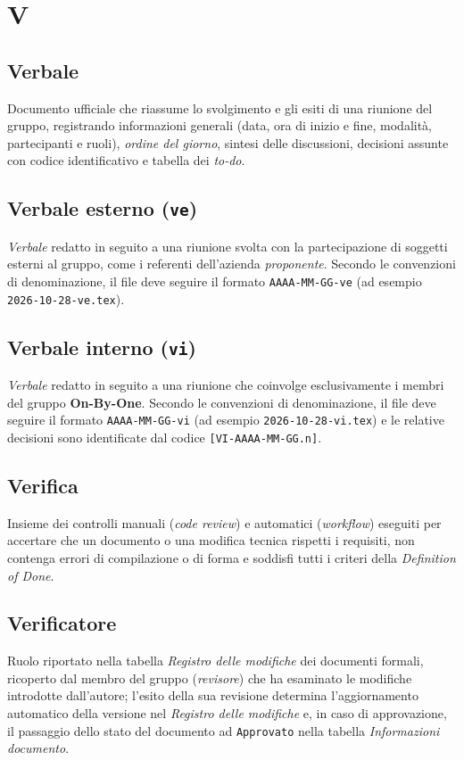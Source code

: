 \documentclass[11pt, a4paper]{article}
\begin{document}
\newpage

\section*{V}

\subsection*{Verbale}
Documento ufficiale che riassume lo svolgimento e gli esiti di una riunione del gruppo, registrando informazioni generali (data, ora di inizio e fine, modalità, partecipanti e ruoli), \textit{ordine del giorno}, sintesi delle discussioni, decisioni assunte con codice identificativo e tabella dei \textit{to-do}.

\subsection*{Verbale esterno (\texttt{ve})}
\textit{Verbale} redatto in seguito a una riunione svolta con la partecipazione di soggetti esterni al gruppo, come i referenti dell'azienda \textit{proponente}. Secondo le convenzioni di denominazione, il file deve seguire il formato \texttt{AAAA-MM-GG-ve} (ad esempio \texttt{2026-10-28-ve.tex}).

\subsection*{Verbale interno (\texttt{vi})}
\textit{Verbale} redatto in seguito a una riunione che coinvolge esclusivamente i membri del gruppo \textbf{On-By-One}. Secondo le convenzioni di denominazione, il file deve seguire il formato \texttt{AAAA-MM-GG-vi} (ad esempio \texttt{2026-10-28-vi.tex}) e le relative decisioni sono identificate dal codice \texttt{[VI-AAAA-MM-GG.n]}.

\subsection*{Verifica}
Insieme dei controlli manuali (\textit{code review}) e automatici (\textit{workflow}) eseguiti per accertare che un documento o una modifica tecnica rispetti i requisiti, non contenga errori di compilazione o di forma e soddisfi tutti i criteri della \textit{Definition of Done}.

\subsection*{Verificatore}
Ruolo riportato nella tabella \textit{Registro delle modifiche} dei documenti formali, ricoperto dal membro del gruppo (\textit{revisore}) che ha esaminato le modifiche introdotte dall'autore; l'esito della sua revisione determina l'aggiornamento automatico della versione nel \textit{Registro delle modifiche} e, in caso di approvazione, il passaggio dello stato del documento ad \texttt{Approvato} nella tabella \textit{Informazioni documento}.
\end{document}
